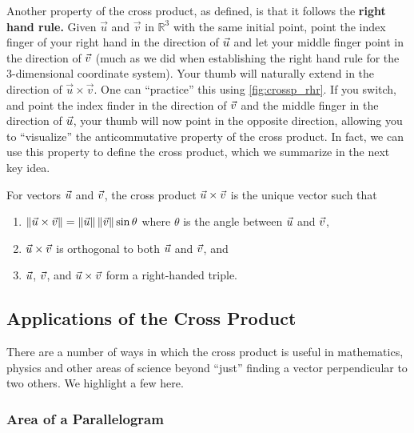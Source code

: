 Another property of the cross product, as defined, is that it follows the \textbf{right hand rule.} Given $\vec u$ and $\vec v$ in $\mathbb{R}^3$ with the same initial point, point the index finger of your right hand in the direction of $\vec u$ and let your middle finger point in the direction of $\vec v$ (much as we did when establishing the right hand rule for the 3-dimensional coordinate system). Your thumb will naturally extend in the direction of $\vec u\times\vec v$. One can ``practice'' this using \autoref{fig:crossp_rhr}. If you switch, and point the index finder in the direction of $\vec v$ and the middle finger in the direction of $\vec u$, your thumb will now point in the opposite direction, allowing you to ``visualize'' the anticommutative property of the cross product.  In fact, we can use this property to define the cross product, which we summarize in the next key idea.

\begin{keyidea}\label{ki:cross_prod_alt}%
For vectors $\vec u$ and $\vec v$, the cross product $\vec u\times\vec v$ is the unique vector such that
\begin{enumerate}
\item $\left\lVert \vec u\times\vec v \right\rVert=\left\lVert \vec u \right\rVert\left\lVert \vec v \right\rVert\sin\theta$ where $\theta$ is the angle between $\vec u$ and $\vec v$,
\item $\vec u\times\vec v$ is orthogonal to both $\vec u$ and $\vec v$, 
and
\item $\vec u$, $\vec v$, and $\vec u\times\vec v$ form a right-handed triple.
\end{enumerate}
\end{keyidea}

\subsection{Applications of the Cross Product}

There are a number of ways in which the cross product is useful in mathematics, physics and other areas of science beyond ``just'' finding a vector perpendicular to two others. We highlight a few here.

\subsubsection{Area of a Parallelogram}

